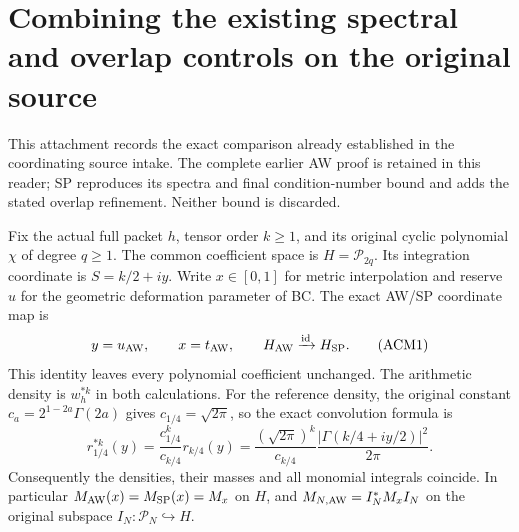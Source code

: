 \section{Combining the existing spectral and overlap controls on the original source}
\label{CFStage:sec:ACM}
This attachment records the exact comparison already established in the
coordinating source intake. The complete earlier AW proof is retained in
this reader; SP reproduces its spectra and final condition-number bound
and adds the stated overlap refinement. Neither bound is discarded.

Fix the actual full packet $h$, tensor order $k\ge1$, and its original
cyclic polynomial $\chi$ of degree $q\ge1$. The common coefficient space
is $H=\mathcal P_{2q}$. Its integration coordinate is $S=k/2+iy$.
Write $x\in[0,1]$ for metric interpolation and reserve $u$ for the
geometric deformation parameter of BC. The exact AW/SP coordinate map is
\[
 y=u_{\rm AW},\qquad x=t_{\rm AW},\qquad
 H_{\rm AW}\xrightarrow{\operatorname{id}}H_{\rm SP}.
 \tag{ACM1}
\]
This identity leaves every polynomial coefficient unchanged. The
arithmetic density is $w_h^{*k}$ in both calculations. For the reference
density, the original constant $c_a=2^{1-2a}\Gamma(2a)$ gives
$c_{1/4}=\sqrt{2\pi}$, so the exact convolution formula is
\[
 r_{1/4}^{*k}(y)=\frac{c_{1/4}^k}{c_{k/4}}r_{k/4}(y)
 =\frac{(\sqrt{2\pi})^k}{c_{k/4}}
       \frac{|\Gamma(k/4+iy/2)|^2}{2\pi}.
 \tag{ACM2}
\]
Consequently the densities, their masses and all monomial integrals
coincide. In particular $M_{\rm AW}(x)=M_{\rm SP}(x)=M_x$ on $H$,
and $M_{N,\rm AW}=I_N^*M_xI_N$ on the original subspace
$I_N:\mathcal P_N\hookrightarrow H$.

